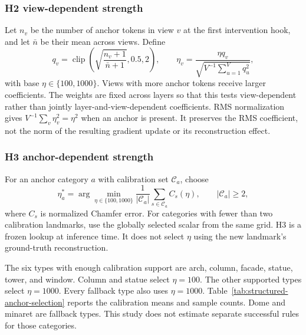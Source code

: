 \subsubsection{H2 view-dependent strength}
Let $n_v$ be the number of anchor tokens in view $v$ at the first intervention hook, and let $\bar n$ be their mean across views. Define
\begin{equation}
 q_v=\operatorname{clip}\!\left(\sqrt{\frac{n_v+1}{\bar n+1}},0.5,2\right),
 \qquad \eta_v=\frac{\eta q_v}{\sqrt{V^{-1}\sum_{u=1}^{V}q_u^2}},
 \label{eq:structured-h2}
\end{equation}
with base $\eta\in\{100,1000\}$. Views with more anchor tokens receive larger coefficients. The weights are fixed across layers so that this tests view-dependent rather than jointly layer-and-view-dependent coefficients. RMS normalization gives $V^{-1}\sum_v\eta_v^2=\eta^2$ when an anchor is present. It preserves the RMS coefficient, not the norm of the resulting gradient update or its reconstruction effect.

\subsubsection{H3 anchor-dependent strength}
For an anchor category $a$ with calibration set $\mathcal C_a$, choose
\begin{equation}
 \eta_a^*=\arg\min_{\eta\in\{100,1000\}}
      \frac{1}{|\mathcal C_a|}\sum_{s\in\mathcal C_a}C_s(\eta),
 \qquad |\mathcal C_a|\ge2,
 \label{eq:structured-h3}
\end{equation}
where $C_s$ is normalized Chamfer error. For categories with fewer than two calibration landmarks, use the globally selected scalar from the same grid. H3 is a frozen lookup at inference time. It does not select $\eta$ using the new landmark's ground-truth reconstruction.

The six types with enough calibration support are arch, column, facade, statue, tower, and window. Column and statue select $\eta=100$. The other supported types select $\eta=1000$. Every fallback type also uses $\eta=1000$. Table~\ref{tab:structured-anchor-selection} reports the calibration means and sample counts. Dome and minaret are fallback types. This study does not estimate separate successful rules for those categories.

\begin{table}[t]
\caption{H3 calibration and frozen choices. Each error is a mean over calibration landmarks of that anchor type. Confirmation counts describe where the frozen choices are evaluated. They do not enter selection. The remaining 19 confirmation landmarks use the global-scalar fallback.}
\label{tab:structured-anchor-selection}
\centering

\end{table}

